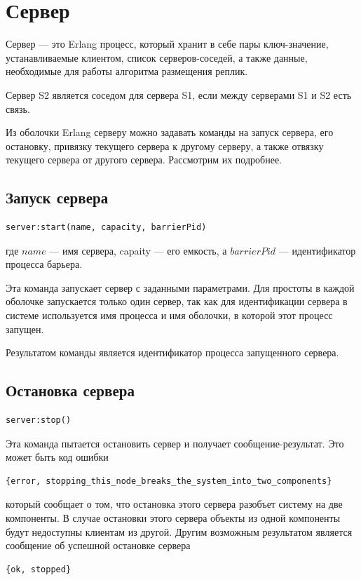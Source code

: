 	\section{Сервер}
		Сервер --- это Erlang процесс, который хранит в себе пары ключ-значение, устанавливаемые клиентом, список серверов-соседей, а также
		данные, необходимые для работы алгоритма размещения реплик. 
		
		Сервер S2 является соседом для сервера S1, если между серверами S1 и S2 есть связь.
		
		Из оболочки Erlang серверу можно задавать команды на запуск сервера, его остановку,
		привязку текущего сервера к другому серверу, а также отвязку текущего сервера от другого сервера. Рассмотрим их подробнее.

		\subsection{Запуск сервера}
			\begin{lstlisting}
server:start(name, capacity, barrierPid)
			\end{lstlisting}
			где $name$ --- имя сервера, capaity --- его емкость, а $barrierPid$ --- идентификатор процесса барьера.
			
			Эта команда запускает сервер с заданными параметрами. Для простоты в каждой оболочке запускается только один сервер, так как
			для идентификации сервера в системе используется имя процесса и имя оболочки, в которой этот процесс запущен.

			Результатом команды является идентификатор процесса запущенного сервера.

		\subsection{Остановка сервера}
			\begin{lstlisting}
server:stop()
			\end{lstlisting}
			Эта команда пытается остановить сервер и получает сообщение-результат. Это может быть код ошибки
			\begin{lstlisting}
{error, stopping_this_node_breaks_the_system_into_two_components}
			\end{lstlisting}
			который сообщает о том, что остановка этого сервера разобъет систему на две компоненты. В случае остановки этого сервера
			объекты из одной компоненты будут недоступны клиентам из другой. Другим возможным результатом является сообщение об успешной
			остановке сервера
			\begin{lstlisting}
{ok, stopped}
			\end{lstlisting}

